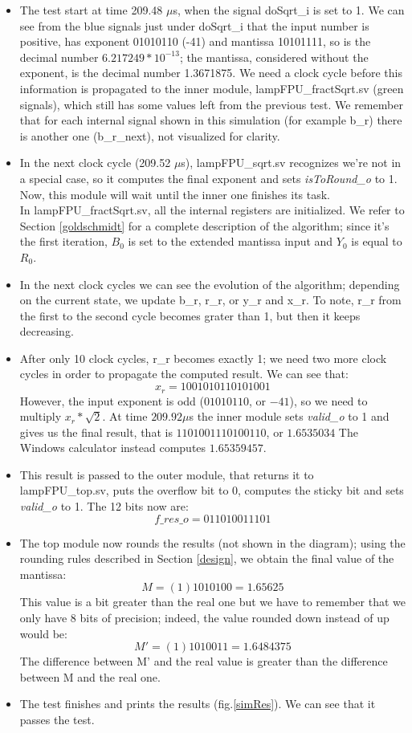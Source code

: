 \begin{itemize}
\item The test start at time 209.48 $\mu$s, when the signal doSqrt\_i is set to 1. We can see from the blue signals just under doSqrt\_i that the input number is positive, has exponent 01010110 (-41) and mantissa 10101111, so is the decimal number $6.217249*10^{-13}$; the mantissa, considered without the exponent, is the decimal number 1.3671875. We need a clock cycle before this information is propagated to the inner module, lampFPU\_fractSqrt.sv (green signals), which still has some values left from the previous test. We remember that for each internal signal shown in this simulation (for example b\_r) there is another one (b\_r\_next), not visualized for clarity.
\item In the next clock cycle (209.52 $\mu$s), lampFPU\_sqrt.sv recognizes we're not in a special case, so it computes the final exponent and sets \emph{isToRound\_o} to 1. Now, this module will wait until the inner one finishes its task.\\
In lampFPU\_fractSqrt.sv, all the internal registers are initialized. We refer to Section \ref{goldschmidt} for a complete description of the algorithm; since it's the first iteration, $B_0$ is set to the extended mantissa input and $Y_0$ is equal to $R_0$. 
\item In the next clock cycles we can see the evolution of the algorithm; depending on the current state, we update b\_r, r\_r, or y\_r and x\_r. To note, r\_r from the first to the second cycle becomes grater than 1, but then it keeps decreasing.
\item After only 10 clock cycles, r\_r becomes exactly 1; we need two more clock cycles in order to propagate the computed result. We can see that: 
$$x_r = 1001010110101001$$However, the input exponent is odd ($01010110$, or $-41$), so we need to multiply
$x_r * \sqrt{2}$. At time $209.92 \mu$s the inner module sets \emph{valid\_o} to 1 and gives us the final result, that is $1101001110100110$, or $1.6535034$ The Windows calculator instead computes $1.65359457$. 
\item This result is passed to the outer module, that returns it to lampFPU\_top.sv, puts the overflow bit to 0, computes the sticky bit and sets \emph{valid\_o} to 1. The 12 bits now are:
$$f\_res\_o = 011010011101$$ 
\item The top module now rounds the results (not shown in the diagram); using the rounding rules described in Section \ref{design}, we obtain the final value of the mantissa:
$$ M = (1)1010100 = 1.65625$$
This value is a bit greater than the real one but we have to remember that we only have 8 bits of precision; indeed, the value rounded down instead of up would be:
 $$ M' = (1)1010011 =1.6484375$$
The difference between M' and the real value is greater than the difference between M and the real one.
\item The test finishes and prints the results (fig.\ref{simRes}). We can see that it passes the test. 
\end{itemize}
